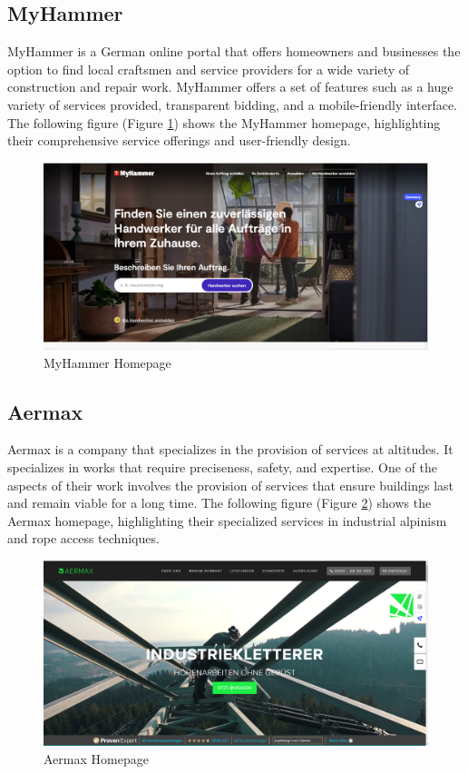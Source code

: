 \subsection{MyHammer  \cite{MyHammer}}
MyHammer is a German online portal that offers homeowners and businesses the option to find local craftsmen and service providers for a wide variety of construction and repair work. MyHammer offers a set of features such as a huge variety of services provided, transparent bidding, and a mobile-friendly interface. The following figure (Figure \ref{fig:myhammer_image}) shows the MyHammer homepage, highlighting their comprehensive service offerings and user-friendly design.
\begin{figure}[H]
    \centering
    \includegraphics[width=\linewidth]{src/assets/chapters/myHammer.PNG}
    \caption{MyHammer Homepage}
    \label{fig:myhammer_image}
\end{figure}



\subsection{Aermax  \cite{Aermax}}
Aermax is a company that specializes in the provision of services at altitudes. It specializes in works that require preciseness, safety, and expertise. One of the aspects of their work involves the provision of services that ensure buildings last and remain viable for a long time. The following figure (Figure \ref{fig:aermax_image}) shows the Aermax homepage, highlighting their specialized services in industrial alpinism and rope access techniques.

\begin{figure}[H]
    \centering
    \includegraphics[width=\linewidth]{src/assets/images/aermax.PNG}
    \caption{Aermax Homepage}
    \label{fig:aermax_image}
\end{figure}

